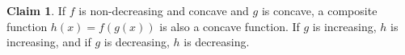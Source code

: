 \documentclass[11pt]{article}
\numberwithin{figure}{section}
\theoremstyle{definition}
\newcommand{\0}{\mathbf{0}}
\newtheorem{claim}{Claim}
\begin{document}
    
    
    
    
\begin{claim}
    If $f$ is non-decreasing and concave and $g$ is concave, a composite function $h(x) = f(g(x))$ is also a concave function. If $g$ is increasing, $h$ is increasing, and if $g$ is decreasing, $h$ is decreasing.
\end{claim}
    
    
    



\end{document}
